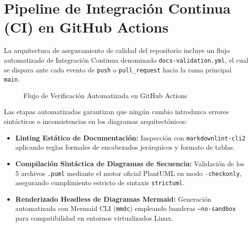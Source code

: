 \section{Pipeline de Integración Continua (CI) en GitHub Actions}
La arquitectura de aseguramiento de calidad del repositorio incluye un flujo automatizado de Integración Continua denominado \texttt{docs-validation.yml}, el cual se dispara ante cada evento de \texttt{push} o \texttt{pull\_request} hacia la rama principal \texttt{main}.

\begin{figure}[H]
\centering
{}
\caption{Flujo de Verificación Automatizada en GitHub Actions}
\label{fig:pipeline_ci}
\end{figure}

Las etapas automatizadas garantizan que ningún cambio introduzca errores sintácticos o inconsistencias en los diagramas arquitectónicos:
\begin{itemize}
    \item \textbf{Linting Estático de Documentación:} Inspección con \texttt{markdownlint-cli2} aplicando reglas formales de encabezados jerárquicos y formato de tablas.
    \item \textbf{Compilación Sintáctica de Diagramas de Secuencia:} Validación de los 5 archivos \texttt{.puml} mediante el motor oficial PlantUML en modo \texttt{-checkonly}, asegurando cumplimiento estricto de sintaxis \texttt{strictuml}.
    \item \textbf{Renderizado Headless de Diagramas Mermaid:} Generación automatizada con Mermaid CLI (\texttt{mmdc}) empleando banderas \texttt{--no-sandbox} para compatibilidad en entornos virtualizados Linux.
\end{itemize}



